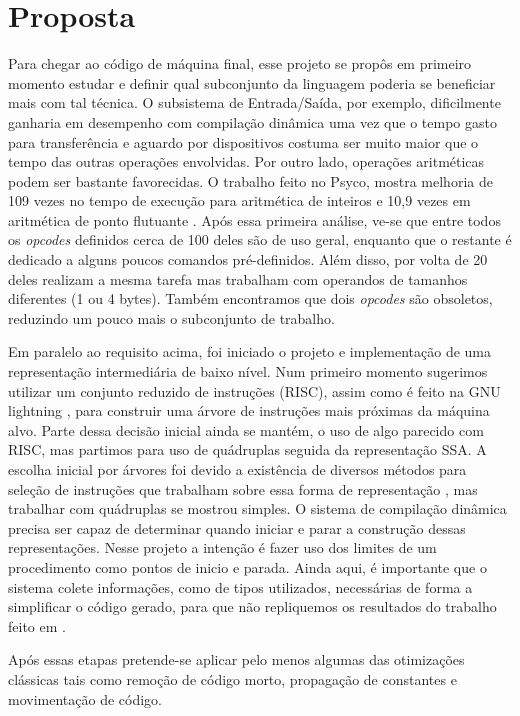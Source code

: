 \section{Proposta}
\label{proposta}

Para chegar ao código de máquina final, esse projeto se propôs em
primeiro momento estudar e definir qual subconjunto da linguagem poderia
se beneficiar mais com tal técnica. O subsistema de Entrada/Saída, por
exemplo, dificilmente ganharia em desempenho com compilação dinâmica
uma vez que o tempo gasto para transferência e aguardo por dispositivos
costuma ser muito maior que o tempo das outras operações envolvidas.
Por outro lado, operações aritméticas podem ser bastante favorecidas.
O trabalho feito no Psyco, mostra melhoria
de 109 vezes no tempo de execução para aritmética de inteiros e 10,9
vezes em aritmética de ponto flutuante \cite{psyco}. Após essa
primeira análise, ve-se que entre todos os
\textit{opcodes} definidos cerca de 100 deles são de
uso geral, enquanto que o restante é dedicado a alguns poucos comandos
pré-definidos. Além disso, por volta de 20 deles realizam a mesma
tarefa mas trabalham com operandos de tamanhos diferentes (1 ou 4
bytes). Também encontramos que dois \textit{opcodes} são obsoletos,
reduzindo um pouco mais o subconjunto de trabalho.

Em paralelo ao requisito acima, foi iniciado o projeto e
implementação de uma representação intermediária de baixo
nível. Num primeiro momento sugerimos utilizar um conjunto reduzido de
instruções (RISC), assim como é feito na GNU lightning \cite{gnu_lightning},
para construir uma
árvore de instruções mais próximas da máquina alvo. Parte dessa
decisão inicial ainda se mantém, o uso de algo parecido com RISC, mas
partimos para uso de quádruplas seguida da representação SSA.
A escolha inicial por árvores foi devido
a existência de diversos métodos para seleção de
instruções que trabalham sobre essa forma de representação
\cite{ir_tree_parsing}, mas trabalhar com quádruplas se mostrou
simples. O sistema de compilação dinâmica precisa ser
capaz de determinar quando iniciar e parar a construção dessas
representações.
Nesse projeto a intenção é fazer uso dos
limites de um procedimento como pontos de inicio e parada. Ainda aqui,
é importante que o sistema colete informações, como de tipos
utilizados, necessárias de forma a simplificar o código gerado, para
que não repliquemos os resultados do trabalho feito em
\cite{vitale_catenation}.

Após essas etapas pretende-se aplicar pelo menos algumas das
otimizações clássicas tais como remoção de código morto, propagação de
constantes e movimentação de código.


